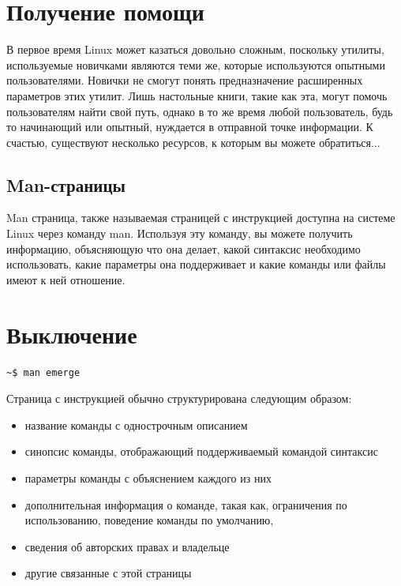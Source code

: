 \documentclass[10pt]{book}
\begin{document}
\section{Получение помощи}

В первое время Linux может казаться довольно сложным, поскольку утилиты, используемые новичками являются теми же, которые используются опытными пользователями. Новички не смогут понять  предназначение расширенных параметров этих утилит.  Лишь настольные книги, такие как эта, могут помочь пользователям найти свой путь, однако в то же время любой пользователь, будь то начинающий или опытный, нуждается в отправной точке информации. К счастью, существуют несколько ресурсов, к которым вы можете обратиться...

\subsection{Man-страницы}

Man страница, также называемая страницей с инструкцией доступна на системе Linux через команду man. Используя эту команду, вы можете получить информацию, объясняющую что она делает, какой синтаксис необходимо использовать, какие параметры она поддерживает и какие команды или файлы имеют к ней отношение. 

\section{Выключение}

\vspace{3mm}
\begin{tcolorbox}
\begin{lstlisting}
~$ man emerge
\end{lstlisting}
\end{tcolorbox}

Страница с инструкцией обычно структурирована следующим образом:

\begin{itemize}
	\item название команды с однострочным описанием
	\item синопсис команды, отображающий поддерживаемый командой синтаксис
	\item параметры команды с объяснением каждого из них
	\item дополнительная информация о команде, такая как, ограничения по использованию, поведение команды по умолчанию, 
	\item сведения об авторских правах и владельце
	\item другие связанные с этой страницы
\end{itemize}
\end{document}
